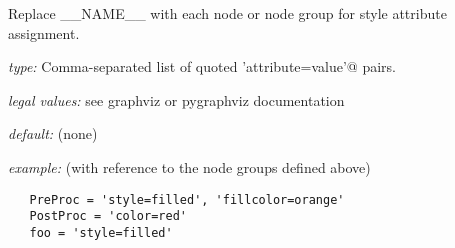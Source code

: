 Replace \_\_NAME\_\_ with each node or node group for style attribute
assignment.

\begin{myitemize}
    \item {\em type:} Comma-separated list of quoted \lstinline@'attribute=value'@ pairs.
    \item {\em legal values:} see graphviz or pygraphviz documentation
    \item {\em default:} (none)
    \item {\em example:} (with reference to the node groups defined above)
\begin{lstlisting}
   PreProc = 'style=filled', 'fillcolor=orange'
   PostProc = 'color=red'
   foo = 'style=filled'
\end{lstlisting}
\end{myitemize}
